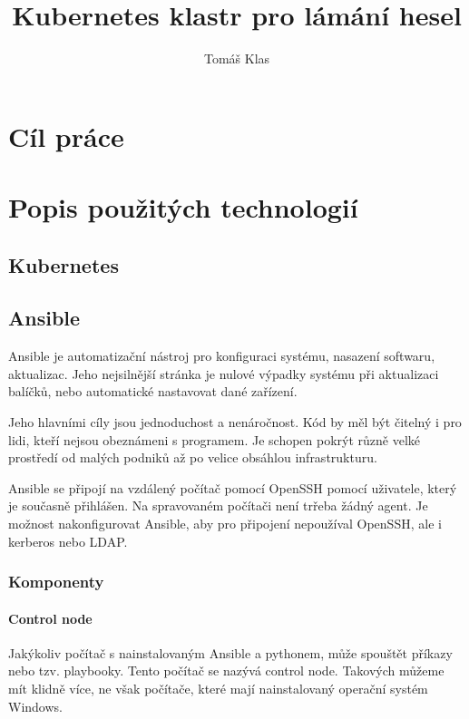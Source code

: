 \documentclass[thesis=B,czech]{FITthesis}[2019/12/23]
\title{Kubernetes klastr pro lámání hesel}
\author{Tomáš Klas} %
\begin{document}

\begin{introduction}
\end{introduction}

\chapter{Cíl práce}


\chapter{Popis použitých technologií}

\section{Kubernetes}


\section{Ansible}

Ansible je automatizační nástroj pro konfiguraci systému, nasazení softwaru, aktualizac. Jeho nejsilnější stránka je nulové výpadky systému při aktualizaci balíčků, nebo automatické nastavovat dané zařízení. 

Jeho hlavními cíly jsou jednoduchost a nenáročnost. Kód by měl být čitelný i pro lidi, kteří nejsou obeznámeni s programem. Je schopen pokrýt různě velké prostředí od malých podniků až po velice obsáhlou infrastrukturu. 

Ansible se připojí na vzdálený počítač pomocí OpenSSH pomocí uživatele, který je současně přihlášen. Na spravovaném počítači není trřeba žádný agent. Je možnost nakonfigurovat Ansible, aby pro připojení nepoužíval OpenSSH, ale i kerberos nebo LDAP. 

\subsection{Komponenty}

\subsubsection{Control node}

Jakýkoliv počítač s nainstalovaným Ansible a pythonem, může spouštět příkazy nebo tzv. playbooky. Tento počítač se nazývá control node. Takových můžeme mít klidně více, ne však počítače, které mají nainstalovaný operační systém Windows. 
\end{document}
